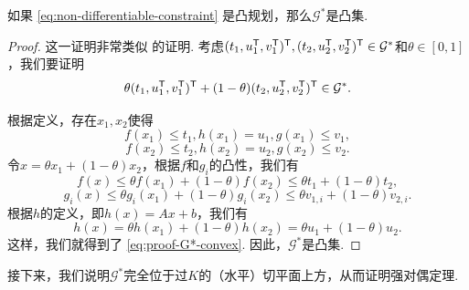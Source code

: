 \begin{lemma}\label{lemma:G*-convex}
    如果 \eqref{eq:non-differentiable-constraint} 是凸规划，那么$\mathcal G^*$是凸集.
\end{lemma}
\begin{proof}
    这一证明非常类似 的证明. 考虑$(t_1,u_1^{\mathsf{T}},v_1^{\mathsf{T}})^{\mathsf{T}},(t_2,u_2^{\mathsf{T}},v_2^{\mathsf{T}})^{\mathsf{T}}\in\mathcal G^*$和$\theta\in[0,1]$，我们要证明
    \begin{equation}
        \theta(t_1,u_1^{\mathsf{T}},v_1^{\mathsf{T}})^{\mathsf{T}}+(1-\theta)(t_2,u_2^{\mathsf{T}},v_2^{\mathsf{T}})^{\mathsf{T}}\in\mathcal G^*.\label{eq:proof-G*-convex}
    \end{equation}
    
    根据定义，存在$x_1,x_2$使得
    \[f(x_1)\leq t_1, h(x_1)=u_1, g(x_1)\leq v_1,\]
    \[f(x_2)\leq t_2, h(x_2)=u_2, g(x_2)\leq v_2.\]
    令$x=\theta x_1+(1-\theta)x_2$，根据$f$和$g_i$的凸性，我们有
    \[f(x)\leq \theta f(x_1)+(1-\theta)f(x_2)\leq \theta t_1+(1-\theta)t_2,\]
    \[g_i(x)\leq \theta g_i(x_1)+(1-\theta)g_i(x_2)\leq \theta v_{1,i}+(1-\theta)v_{2,i}.\]
    根据$h$的定义，即$h(x)=Ax+b$，我们有
    \[h(x)=\theta h(x_1)+(1-\theta)h(x_2)=\theta u_1+(1-\theta)u_2.\]
    这样，我们就得到了 \eqref{eq:proof-G*-convex}. 因此，$\mathcal G^*$是凸集.
\end{proof}

接下来，我们说明$\mathcal G^*$完全位于过$K$的（水平）切平面上方，从而证明强对偶定理.

